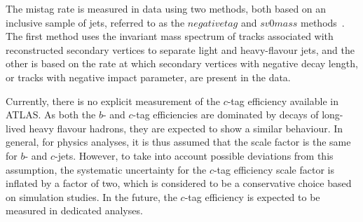 The mistag rate is measured in data using two methods, both based on an inclusive sample of jets, referred to as the $negative tag$ and $sv0mass$ methods~\cite{ATLAS-CONF-2012-040}. The first method uses the invariant mass spectrum of tracks associated with reconstructed secondary vertices to separate light and heavy-flavour jets, and the other is based on the rate at which secondary vertices with negative decay length, or tracks with negative impact parameter, are present in the data.


Currently, there is no explicit measurement of the $c$-tag efficiency available in ATLAS. As both the
$b$- and $c$-tag efficiencies are dominated by decays of long-lived heavy flavour hadrons, they are expected to show a similar behaviour. In general, for physics analyses, it is thus assumed that the scale factor is the same for $b$- and $c$-jets. However, to take into account possible deviations from this assumption, the systematic uncertainty for the $c$-tag efficiency scale factor is inflated by a factor of two, which is considered to be a conservative choice based on simulation studies. In the future, the $c$-tag efficiency is expected to be measured in dedicated analyses.



